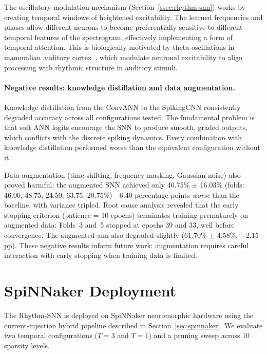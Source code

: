 The oscillatory modulation mechanism (Section~\ref{ssec:rhythm-snn}) works by creating temporal windows of heightened excitability. The learned frequencies and phases allow different neurons to become preferentially sensitive to different temporal features of the spectrogram, effectively implementing a form of temporal attention. This is biologically motivated by theta oscillations in mammalian auditory cortex~\citep{lakatos2005oscillatory}, which modulate neuronal excitability to align processing with rhythmic structure in auditory stimuli.

\paragraph{Negative results: knowledge distillation and data augmentation.}
Knowledge distillation from the ConvANN to the SpikingCNN consistently degraded accuracy across all configurations tested. The fundamental problem is that soft ANN logits encourage the SNN to produce smooth, graded outputs, which conflicts with the discrete spiking dynamics. Every combination with knowledge distillation performed worse than the equivalent configuration without it.

Data augmentation (time-shifting, frequency masking, Gaussian noise) also proved harmful: the augmented SNN achieved only 40.75\% $\pm$ 16.03\% (folds: 46.00, 48.75, 24.50, 63.75, 20.75\%)---6.40 percentage points \emph{worse} than the baseline, with variance tripled. Root cause analysis revealed that the early stopping criterion (patience = 10 epochs) terminates training prematurely on augmented data: Folds~3 and~5 stopped at epochs 39 and 33, well before convergence. The augmented \gls{ann} also degraded slightly (61.70\% $\pm$ 4.58\%, $-$2.15 pp). These negative results inform future work: augmentation requires careful interaction with early stopping when training data is limited.

\section{SpiNNaker Deployment}
\label{sec:spinnaker-results}

The Rhythm-SNN is deployed on SpiNNaker neuromorphic hardware using the current-injection hybrid pipeline described in Section~\ref{sec:spinnaker}. We evaluate two temporal configurations ($T = 3$ and $T = 1$) and a pruning sweep across 10 sparsity levels.


